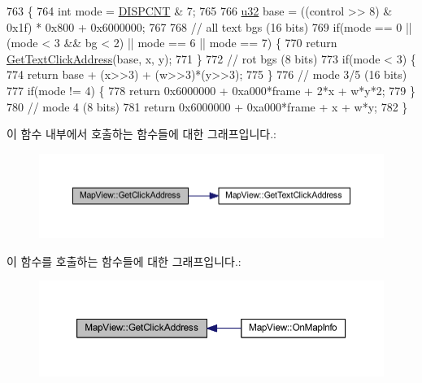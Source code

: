 \begin{DoxyCode}
763 \{
764   \textcolor{keywordtype}{int} mode = \mbox{\hyperlink{_globals_8cpp_a843ca20ea4281609edb7d32392e31de8}{DISPCNT}} & 7;
765 
766   \mbox{\hyperlink{_system_8h_a10e94b422ef0c20dcdec20d31a1f5049}{u32}} base = ((control >> 8) & 0x1f) * 0x800 + 0x6000000;
767   
768   \textcolor{comment}{// all text bgs (16 bits)}
769   \textcolor{keywordflow}{if}(mode == 0 ||(mode < 3 && bg < 2) || mode == 6 || mode == 7) \{
770     \textcolor{keywordflow}{return} \mbox{\hyperlink{class_map_view_a30bef411235a6b8666f34991c2b90619}{GetTextClickAddress}}(base, x, y);
771   \}
772   \textcolor{comment}{// rot bgs (8 bits)}
773   \textcolor{keywordflow}{if}(mode < 3) \{
774     \textcolor{keywordflow}{return} base + (x>>3) + (w>>3)*(y>>3);
775   \}
776   \textcolor{comment}{// mode 3/5 (16 bits)}
777   \textcolor{keywordflow}{if}(mode != 4) \{
778     \textcolor{keywordflow}{return} 0x6000000 + 0xa000*frame + 2*x + w*y*2;
779   \}
780   \textcolor{comment}{// mode 4 (8 bits)}
781   \textcolor{keywordflow}{return} 0x6000000 + 0xa000*frame + x + w*y;
782 \}
\end{DoxyCode}
이 함수 내부에서 호출하는 함수들에 대한 그래프입니다.\+:
\nopagebreak
\begin{figure}[H]
\begin{center}
\leavevmode
\includegraphics[width=350pt]{class_map_view_ad05aa1227f5a62d8e9477eeeec37115c_cgraph}
\end{center}
\end{figure}
이 함수를 호출하는 함수들에 대한 그래프입니다.\+:
\nopagebreak
\begin{figure}[H]
\begin{center}
\leavevmode
\includegraphics[width=350pt]{class_map_view_ad05aa1227f5a62d8e9477eeeec37115c_icgraph}
\end{center}
\end{figure}
\mbox{\label{class_map_view_a30bef411235a6b8666f34991c2b90619}} 
